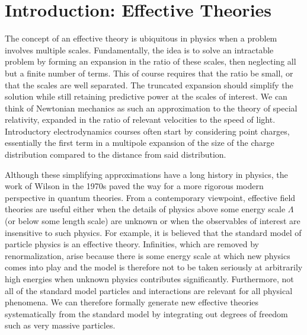 \chapter{\label{chap:Introduction}Introduction: Effective Theories}

The concept of an effective theory is ubiquitous in physics when a problem involves multiple scales. Fundamentally, the idea is to solve an intractable problem by forming an expansion in the ratio of these scales, then neglecting all but a finite number of terms. This of course requires that the ratio be small, or that the scales are well separated. The truncated expansion should simplify the solution while still retaining predictive power at the scales of interest. We can think of Newtonian mechanics as such an approximation to the theory of special relativity, expanded in the ratio of relevant velocities to the speed of light. Introductory electrodynamics courses often start by considering point charges, essentially the first term in a multipole expansion of the size of the charge distribution compared to the distance from said distribution.

Although these simplifying approximations have a long history in physics,  the work of Wilson \cite{Wilson197475} in the 1970s paved the way for a more rigorous modern perspective in quantum theories. From a contemporary viewpoint, effective field theories are useful either when the details of physics above some energy scale $\Lambda$ (or below some length scale) are unknown or when the observables of interest are insensitive to such physics. For example, it is believed that the standard model of particle physics is an effective theory. Infinities, which are removed by renormalization, arise because there is some energy scale at which new physics comes into play and the model is therefore not to be taken seriously at arbitrarily high energies when unknown physics contributes significantly. Furthermore, not all of the standard model particles and interactions are relevant for all physical phenomena. We can therefore formally generate new effective theories systematically from the standard model by integrating out degrees of freedom such as very massive particles. 

